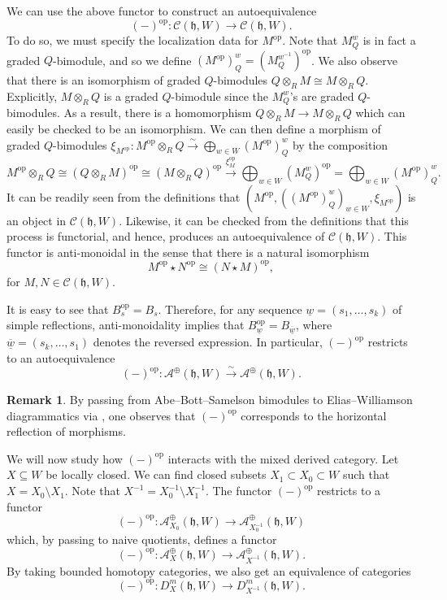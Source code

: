 \documentclass{amsart}
\newcommand{\scrC}{\mathcal{C}}
\newcommand{\scrA}{\mathcal{A}}
\newcommand{\uw}{\underline{w}}
\newcommand{\BE}{D^m}
\newcommand{\fr}[1]{\mathfrak{#1}}
\DeclareMathOperator{\op}{op}
\theoremstyle{definition}
\newtheorem{remark}{Remark}[section]
\begin{document}
        We can use the above functor to construct an autoequivalence
        \[(-)^{\op} : \scrC (\fr{h}, W) \to \scrC (\fr{h}, W).\]
        To do so, we must specify the localization data for $M^{\op}$. Note that $M_Q^w$ is in fact a graded $Q$-bimodule, and so we define $(M^{\op})_Q^w = (M_Q^{w^{-1}})^{\op}$.
        We also observe that there is an isomorphism of graded $Q$-bimodules $Q \otimes_R M \cong M \otimes_R Q$. Explicitly, $M \otimes_R Q$ is a graded $Q$-bimodule since the $M_Q^w$'s are graded $Q$-bimodules.
        As a result, there is a homomorphism $Q \otimes_R M \to M \otimes_R Q$ which can easily be checked to be an isomorphism.
        We can then define a morphism of graded $Q$-bimodules $\xi_{M^{\op}} : M^{\op} \otimes_R Q \stackrel{\sim}{\to} \bigoplus_{w \in W} (M^{\op})_Q^w$ by the composition
        \[M^{\op} \otimes_R Q \cong (Q \otimes_R M)^{\op} \cong (M \otimes_R Q)^{\op} \stackrel{\xi_{M}^{\op}}{\to} \bigoplus_{w \in W} (M_Q^w)^{\op} = \bigoplus_{w \in W} (M^{\op})_Q^w.\]
        It can be readily seen from the definitions that $(M^{\op}, ((M^{\op})_Q^w)_{w \in W}, \xi_{M^{\op}})$ is an object in $\scrC (\fr{h}, W)$. 
        Likewise, it can be checked from the definitions that this process is functorial, and hence, produces an autoequivalence of $\scrC (\fr{h}, W)$.
        This functor is anti-monoidal in the sense that there is a natural isomorphism
        \begin{equation}M^{\op} \star N^{\op} \cong (N \star M)^{\op},\end{equation}
        for $M,N \in \scrC (\fr{h}, W)$.

        It is easy to see that $B_s^{\op} = B_s$. Therefore, for any sequence $\uw = (s_1, \ldots, s_k)$ of simple reflections, anti-monoidality implies that $B_{\uw}^{\op} = B_{\overline{\uw}}$, where $\overline{\uw} = (s_k, \ldots, s_1)$ denotes the reversed expression.
        In particular, $(-)^{\op}$ restricts to an autoequivalence
        \[(-)^{\op} : \scrA^{\oplus} (\fr{h}, W) \stackrel{\sim}{\to} \scrA^{\oplus} (\fr{h}, W). \]
        
        \begin{remark}
                By passing from Abe--Bott--Samelson bimodules to Elias--Williamson diagrammatics via \cite[Theorem 5.6]{Abe19}, one observes that $(-)^{\op}$ corresponds to the horizontal reflection of morphisms.
        \end{remark}

        We will now study how $(-)^{\op}$ interacts with the mixed derived category.
        Let $X \subseteq W$ be locally closed. We can find closed subsets $X_1 \subset X_0 \subset W$ such that $X = X_0 \setminus X_1$. Note that $X^{-1} = X_0^{-1} \setminus X_1^{-1}$.
        The functor $(-)^{\op}$ restricts to a functor
        \[(-)^{\op} : \scrA^{\oplus}_{X_0} (\fr{h}, W) \to \scrA^{\oplus}_{X_0^{-1}} (\fr{h}, W)\]
        which, by passing to naive quotients, defines a functor
        \[(-)^{\op} : \scrA^{\oplus}_{X} (\fr{h}, W) \to \scrA^{\oplus}_{X^{-1}} (\fr{h}, W). \]
        By taking bounded homotopy categories, we also get an equivalence of categories
        \[(-)^{\op} : \BE_X (\fr{h}, W) \to \BE_{X^{-1}} (\fr{h}, W).\]
\end{document}
